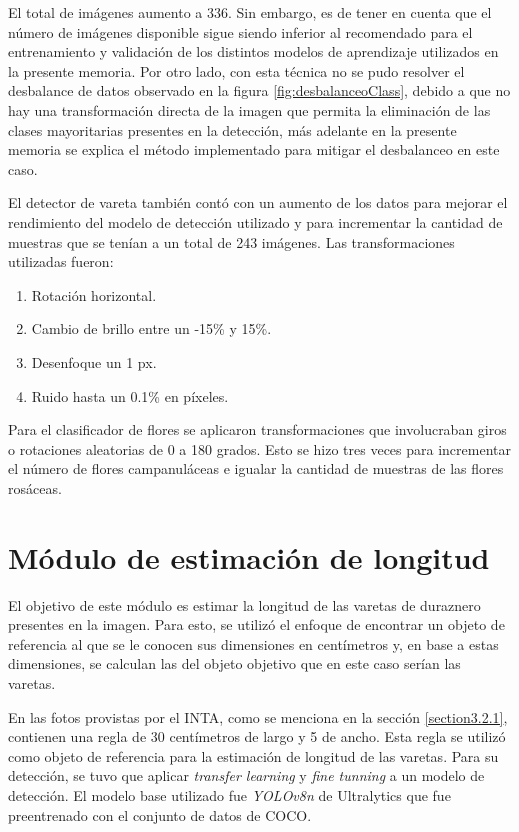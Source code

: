 El total de imágenes aumento a 336. Sin embargo, es de tener en cuenta que el número de imágenes disponible sigue siendo inferior al recomendado para el entrenamiento y validación de los distintos modelos de aprendizaje utilizados en la presente memoria. Por otro lado, con esta técnica no se pudo resolver el desbalance de datos observado en la figura \ref{fig:desbalanceoClass}, debido a que no hay una transformación directa de la imagen que permita la eliminación de las clases mayoritarias presentes en la detección, más adelante en la presente memoria se explica el método implementado para mitigar el desbalanceo en este caso.

El detector de vareta también contó con un aumento de los datos para mejorar el rendimiento del modelo de detección utilizado y para incrementar la cantidad de muestras que se tenían a un total de 243 imágenes. Las transformaciones utilizadas fueron:

\begin{enumerate}
	\item Rotación horizontal.
	\item Cambio de brillo entre un -15\% y 15\%. 
	\item Desenfoque un 1 px.
	\item Ruido hasta un 0.1\% en píxeles.
\end{enumerate}

Para el clasificador de flores se aplicaron transformaciones que involucraban giros o rotaciones aleatorias de 0 a 180 grados. Esto se hizo tres veces para incrementar el número de flores campanuláceas e igualar la cantidad de muestras de las flores rosáceas.

\section{Módulo de estimación de longitud}

El objetivo de este módulo es estimar la longitud de las varetas de duraznero presentes en la imagen. Para esto, se utilizó el enfoque de encontrar un objeto de referencia al que se le conocen sus dimensiones en centímetros y, en base a estas dimensiones, se calculan las del objeto objetivo que en este caso serían las varetas. 

En las fotos provistas por el INTA, como se menciona en la sección \ref{section3.2.1}, contienen una regla de 30 centímetros de largo y 5 de ancho. Esta regla se utilizó como objeto de referencia para la estimación de longitud de las varetas. Para su detección, se tuvo que aplicar \textit{transfer learning} y \textit{fine tunning} a un modelo de detección. El modelo base utilizado fue \textit{YOLOv8n} de Ultralytics que fue preentrenado con el conjunto de datos de COCO.

